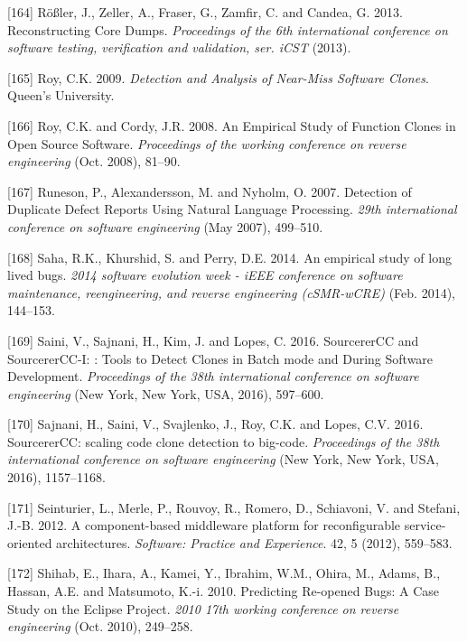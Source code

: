 \documentclass[12pt]{report}
\begin{document}
\hypertarget{ref-Rossler2013}{}
{[}164{]} Rößler, J., Zeller, A., Fraser, G., Zamfir, C. and Candea, G.
2013. Reconstructing Core Dumps. \emph{Proceedings of the 6th
international conference on software testing, verification and
validation, ser. iCST} (2013).

\hypertarget{ref-Iss2009}{}
{[}165{]} Roy, C.K. 2009. \emph{Detection and Analysis of Near-Miss
Software Clones}. Queen's University.

\hypertarget{ref-Roy2008}{}
{[}166{]} Roy, C.K. and Cordy, J.R. 2008. An Empirical Study of Function
Clones in Open Source Software. \emph{Proceedings of the working
conference on reverse engineering} (Oct. 2008), 81--90.

\hypertarget{ref-Runeson2007}{}
{[}167{]} Runeson, P., Alexandersson, M. and Nyholm, O. 2007. Detection
of Duplicate Defect Reports Using Natural Language Processing.
\emph{29th international conference on software engineering} (May 2007),
499--510.

\hypertarget{ref-Saha2014}{}
{[}168{]} Saha, R.K., Khurshid, S. and Perry, D.E. 2014. An empirical
study of long lived bugs. \emph{2014 software evolution week - iEEE
conference on software maintenance, reengineering, and reverse
engineering (cSMR-wCRE)} (Feb. 2014), 144--153.

\hypertarget{ref-Saini2016}{}
{[}169{]} Saini, V., Sajnani, H., Kim, J. and Lopes, C. 2016.
SourcererCC and SourcererCC-I: : Tools to Detect Clones in Batch mode
and During Software Development. \emph{Proceedings of the 38th
international conference on software engineering} (New York, New York,
USA, 2016), 597--600.

\hypertarget{ref-Sajnani2016}{}
{[}170{]} Sajnani, H., Saini, V., Svajlenko, J., Roy, C.K. and Lopes,
C.V. 2016. SourcererCC: scaling code clone detection to big-code.
\emph{Proceedings of the 38th international conference on software
engineering} (New York, New York, USA, 2016), 1157--1168.

\hypertarget{ref-Seinturier2012}{}
{[}171{]} Seinturier, L., Merle, P., Rouvoy, R., Romero, D., Schiavoni,
V. and Stefani, J.-B. 2012. A component-based middleware platform for
reconfigurable service-oriented architectures. \emph{Software: Practice
and Experience}. 42, 5 (2012), 559--583.

\hypertarget{ref-Shihab2010}{}
{[}172{]} Shihab, E., Ihara, A., Kamei, Y., Ibrahim, W.M., Ohira, M.,
Adams, B., Hassan, A.E. and Matsumoto, K.-i. 2010. Predicting Re-opened
Bugs: A Case Study on the Eclipse Project. \emph{2010 17th working
conference on reverse engineering} (Oct. 2010), 249--258.
\end{document}
